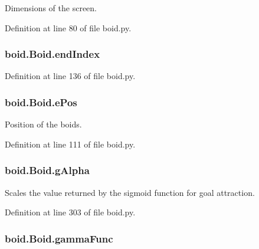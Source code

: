 Dimensions of the screen. 



Definition at line 80 of file boid.\-py.

\hypertarget{classboid_1_1Boid_ae0e9562ea35dca5f6d88e132cb5dd73a}{
\subsubsection[{end\-Index}]{\setlength{\rightskip}{0pt plus 5cm}boid.\-Boid.\-end\-Index}}\label{classboid_1_1Boid_ae0e9562ea35dca5f6d88e132cb5dd73a}


Definition at line 136 of file boid.\-py.

\hypertarget{classboid_1_1Boid_a15b3d73058c73aed19d2e9fb0266805d}{
\subsubsection[{e\-Pos}]{\setlength{\rightskip}{0pt plus 5cm}boid.\-Boid.\-e\-Pos}}\label{classboid_1_1Boid_a15b3d73058c73aed19d2e9fb0266805d}


Position of the boids. 



Definition at line 111 of file boid.\-py.

\hypertarget{classboid_1_1Boid_a5090639a7e3a489c8dc83bd12b6d1653}{
\subsubsection[{g\-Alpha}]{\setlength{\rightskip}{0pt plus 5cm}boid.\-Boid.\-g\-Alpha}}\label{classboid_1_1Boid_a5090639a7e3a489c8dc83bd12b6d1653}


Scales the value returned by the sigmoid function for goal attraction. 



Definition at line 303 of file boid.\-py.

\hypertarget{classboid_1_1Boid_abce5218cbba7b3d9f12dc78bbb9dab5e}{
\subsubsection[{gamma\-Func}]{\setlength{\rightskip}{0pt plus 5cm}boid.\-Boid.\-gamma\-Func}}\label{classboid_1_1Boid_abce5218cbba7b3d9f12dc78bbb9dab5e}


